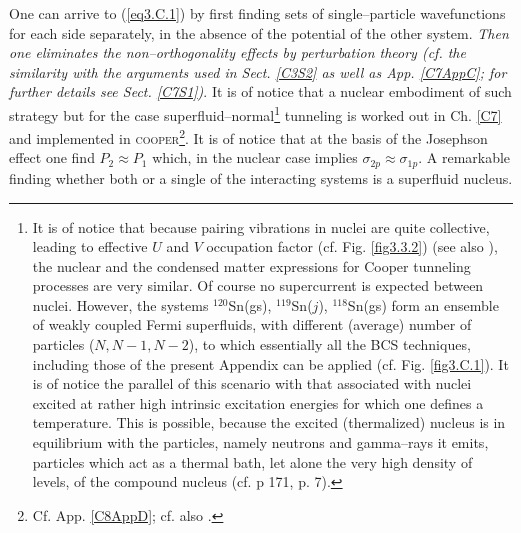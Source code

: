 One can arrive to  (\ref{eq3.C.1}) by first finding sets of single--particle wavefunctions for each side separately, in the absence of the potential of the other system. \textit{Then one eliminates the non--orthogonality effects by perturbation theory (cf. the similarity with the arguments used in Sect. \ref{C3S2} as well as App. \ref{C7AppC}; for further details see Sect. \ref{C7S1})}. It is of notice that a nuclear embodiment of such strategy but for the case superfluid--normal\footnote{\label{f45}It is of notice that because  pairing vibrations in nuclei are quite collective, leading to effective $U$ and $V$ occupation factor (cf. Fig. \ref{fig3.3.2}) (see also \cite{Potel:13b}), the nuclear and the condensed matter expressions for Cooper tunneling processes are very similar. Of course no supercurrent is expected between nuclei. However, the systems $^{120}$Sn(gs), $^{119}$Sn($j$), $^{118}$Sn(gs) form an ensemble of weakly coupled Fermi superfluids, with different (average) number of particles ($N,N-1,N-2$), to which essentially all the BCS techniques, including those of the present Appendix can be applied (cf. Fig. \ref{fig3.C.1}). It is of notice the parallel of this scenario with that associated with nuclei excited at rather high intrinsic excitation energies for which one defines a temperature. This is possible, because the excited (thermalized) nucleus is in equilibrium with the particles, namely neutrons and gamma--rays it emits, particles which act as a thermal bath, let alone the very high density of levels, of the compound nucleus (cf. \cite{Bertsch:05} p 171, \cite{Bortignon:98} p. 7).} tunneling is worked out in Ch. \ref{C7} and implemented in \textsc{cooper}\footnote{Cf. App. \ref{C8AppD}; cf. also \cite{Broglia:04a}.}. It is of notice that at the basis of the Josephson effect one find $P_2\approx P_1$ which, in the nuclear case implies $\sigma_{2p}\approx\sigma_{1p}$. A remarkable finding whether both or a single of the interacting systems is a superfluid nucleus. 


